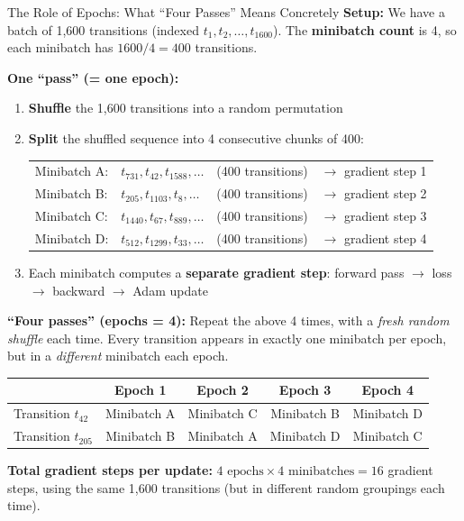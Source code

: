 \documentclass[aspectratio=169,11pt]{beamer}
\begin{document}
\begin{frame}{The Role of Epochs: What ``Four Passes'' Means Concretely}
  \small
  \textbf{Setup:} We have a batch of 1{,}600 transitions (indexed $t_1, t_2, \ldots, t_{1600}$).
  The \textbf{minibatch count} is 4, so each minibatch has $1600 / 4 = 400$ transitions.

  \medskip
  \textbf{One ``pass'' (= one epoch):}
  \begin{enumerate}\setlength\itemsep{1pt}
    \item \textbf{Shuffle} the 1{,}600 transitions into a random permutation
    \item \textbf{Split} the shuffled sequence into 4 consecutive chunks of 400:
      \begin{center}\scriptsize
      \begin{tabular}{llll}
        Minibatch A: & $t_{731}, t_{42}, t_{1588}, \ldots$ & (400 transitions) & $\to$ gradient step 1 \\
        Minibatch B: & $t_{205}, t_{1103}, t_{8}, \ldots$  & (400 transitions) & $\to$ gradient step 2 \\
        Minibatch C: & $t_{1440}, t_{67}, t_{889}, \ldots$ & (400 transitions) & $\to$ gradient step 3 \\
        Minibatch D: & $t_{512}, t_{1299}, t_{33}, \ldots$ & (400 transitions) & $\to$ gradient step 4 \\
      \end{tabular}
      \end{center}
    \item Each minibatch computes a \textbf{separate gradient step}: forward pass $\to$ loss $\to$ backward $\to$ Adam update
  \end{enumerate}

  \medskip
  \textbf{``Four passes'' (epochs = 4):} Repeat the above 4 times, with a
  \emph{fresh random shuffle} each time.  Every transition appears in exactly
  one minibatch per epoch, but in a \emph{different} minibatch each epoch.

  \smallskip
  \begin{center}\scriptsize
  \begin{tabular}{lcccc}
    \toprule
    & \textbf{Epoch 1} & \textbf{Epoch 2} & \textbf{Epoch 3} & \textbf{Epoch 4} \\
    \midrule
    Transition $t_{42}$  & Minibatch A & Minibatch C & Minibatch B & Minibatch D \\
    Transition $t_{205}$ & Minibatch B & Minibatch A & Minibatch D & Minibatch C \\
    \bottomrule
  \end{tabular}
  \end{center}

  \textbf{Total gradient steps per update:} $4 \text{ epochs} \times 4 \text{ minibatches} = 16$ gradient steps,
  using the same 1{,}600 transitions (but in different random groupings each time).
\end{frame}
\end{document}
